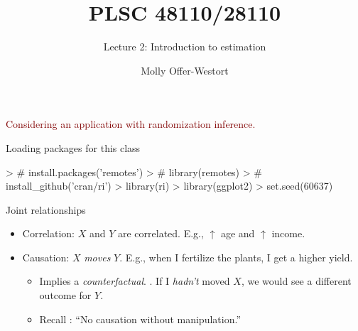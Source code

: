 \documentclass[xcolor={dvipsnames},handout]{beamer}
\title{PLSC 48110/28110}
\subtitle{Lecture 2: Introduction to estimation}
\date{}
\author{Molly Offer-Westort}
\institute{Department of Political Science, \\University of Chicago}
\begin{document}
\frame{\titlepage
\thispagestyle{empty}
}

\begin{frame}[c]{}
\centering
\textcolor{Maroon}{Considering an application with randomization inference.}


\end{frame}



\begin{frame}[fragile]
\renewcommand{\Sweavesize}{\scriptsize}{Loading packages for this class}

\begin{Schunk}
\begin{Sinput}
> # install.packages('remotes')
> # library(remotes)
> # install_github('cran/ri')
> library(ri)
> library(ggplot2)
> set.seed(60637)
\end{Sinput}
\end{Schunk}

\end{frame}





\begin{frame}{Joint relationships}

\begin{itemize}
\item Correlation: $X$ and $Y$ are correlated. E.g., $\uparrow$ age and $\uparrow$ income.
\item Causation: $X$ \textit{moves} $Y$. E.g., when I fertilize the plants, I get a higher yield.
\begin{itemize}
\item Implies a \textit{counterfactual}. . If I \textit{hadn't} moved $X$, we would see a different outcome for $Y$.
\item Recall \cite{holland1986statistics}: ``No causation without manipulation.''
\end{itemize}
\end{itemize}

\end{frame}
\end{document}
